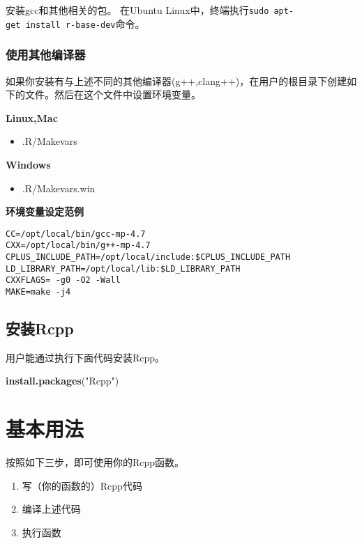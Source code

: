 \documentclass[]{ctexbook}
\newenvironment{Shaded}{\begin{snugshade}}{\end{snugshade}}
\newcommand{\KeywordTok}[1]{\textcolor[rgb]{0.13,0.29,0.53}{\textbf{#1}}}
\newcommand{\StringTok}[1]{\textcolor[rgb]{0.31,0.60,0.02}{#1}}
\newcommand{\NormalTok}[1]{#1}
\providecommand{\tightlist}{%
  \setlength{\itemsep}{0pt}\setlength{\parskip}{0pt}}
\begin{document}
安装gcc和其他相关的包。 在Ubuntu
Linux中，终端执行\texttt{sudo\ apt-get\ install\ r-base-dev}命令。

\subsection{使用其他编译器}

如果你安装有与上述不同的其他编译器(g++,clang++)，在用户的根目录下创建如下的文件。然后在这个文件中设置环境变量。

\textbf{Linux,Mac}

\begin{itemize}
\tightlist
\item
  .R/Makevars
\end{itemize}

\textbf{Windows}

\begin{itemize}
\tightlist
\item
  .R/Makevars.win
\end{itemize}

\textbf{环境变量设定范例}

\begin{verbatim}
CC=/opt/local/bin/gcc-mp-4.7
CXX=/opt/local/bin/g++-mp-4.7
CPLUS_INCLUDE_PATH=/opt/local/include:$CPLUS_INCLUDE_PATH
LD_LIBRARY_PATH=/opt/local/lib:$LD_LIBRARY_PATH
CXXFLAGS= -g0 -O2 -Wall
MAKE=make -j4
\end{verbatim}

\section{安装Rcpp}\label{Rcppinstallation}

用户能通过执行下面代码安装Rcpp。

\begin{Shaded}
\begin{Highlighting}[]
\KeywordTok{install.packages}\NormalTok{(}\StringTok{"Rcpp"}\NormalTok{)}
\end{Highlighting}
\end{Shaded}

\chapter{基本用法}\label{basicUsage}

按照如下三步，即可使用你的Rcpp函数。

\begin{enumerate}
\def\labelenumi{\arabic{enumi}.}
\tightlist
\item
  写（你的函数的）Rcpp代码
\item
  编译上述代码
\item
  执行函数
\end{enumerate}
\end{document}
